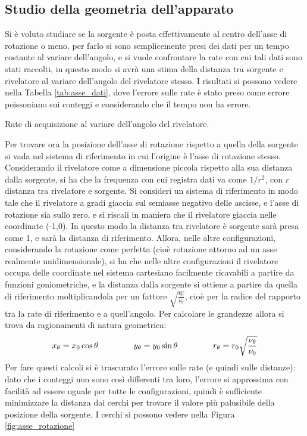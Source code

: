 \subsection{Studio della geometria dell'apparato}
Si è voluto studiare se la sorgente è posta effettivamente al centro dell'asse di rotazione o meno. per farlo si sono semplicemente presi dei dati per un tempo
costante al variare dell'angolo, e si vuole confrontare la rate con cui tali dati sono stati raccolti, in questo modo si avrà una stima della distanza tra sorgente e
rivelatore al variare dell'angolo del rivelatore stesso. I risultati si possono vedere nella Tabella \ref{tab:asse_dati}, dove l'errore sulle rate è stato preso
come errore poissoniano sui conteggi e considerando che il tempo non ha errore.
%
\begin{table}[h]
	\centering
	
	\caption{Rate di acquisizione al variare dell'angolo del rivelatore.}
	\label{tab:asse_dati}
\end{table}
%
Per trovare ora la posizione dell'asse di rotazione rispetto a quella della sorgente si vada nel sistema di riferimento in cui l'origine è l'asse di rotazione stesso.
Considerando il rivelatore come a dimensione piccola rispetto alla sua distanza dalla sorgente, si ha che la frequenza con cui registra dati va come $1/r^2$, con $r$ distanza
tra rivelatore e sorgente. Si consideri un sistema di riferimento in modo tale che il rivelatore a  gradi giaccia sul semiasse negativo delle ascisse, e l'asse di
rotazione sia sullo zero, e si riscali in maniera che il rivelatore giaccia nelle coordinate (-1,0). In questo modo la distanza tra rivelatore è sorgente sarà presa come 1,
e sarà la distanza di riferimento. Allora, nelle altre configurazioni, considerando la rotazione come perfetta (cioè rotazione attorno ad un asse realmente unidimensionale),
si ha che nelle altre configurazioni il rivelatore occupa delle coordinate nel sistema cartesiano facilmente ricavabili a partire da funzioni goniometriche, e la distanza
dalla sorgente si ottiene a partire da quella di riferimento moltiplicandola per un fattore $\sqrt{\frac{\nu_0}{\nu_\theta}}$, cioè per la radice del rapporto tra la rate
di riferimento e a quell'angolo. Per calcolare le grandezze allora si trova da ragionamenti di natura geometrica:
$$ x_\theta = x_0 \cos \theta \hspace{1.5cm} y_\theta = y_0 \sin \theta \hspace{1.5cm} r_\theta = r_0 \sqrt{\frac{\nu_\theta}{\nu_0}}$$
Per fare questi calcoli si è trascurato l'errore sulle rate (e quindi sulle distanze): dato che i conteggi non sono così differenti tra loro, l'errore si approssima con facilità
ad essere uguale per tutte le configurazioni, quindi è sufficiente minimizzare la distanza dai cerchi per trovare il valore più palusibile della posizione della sorgente.
I cerchi si possono vedere nella Figura \ref{fig:asse_rotazione}\\


